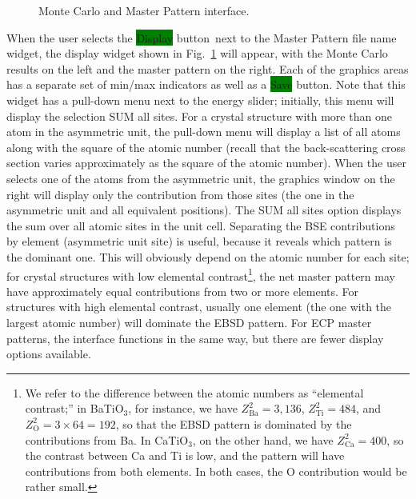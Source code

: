 \documentclass[DIV=calc, paper=letter, fontsize=11pt]{scrartcl}	 %
\newcommand{\button}[1]{\colorbox{green}{\textsf{#1}} button}
\begin{document}
\begin{figure}[t]
\leavevmode\centering
\epsfxsize=6in
\caption{\label{fig:MCMPdisplay}Monte Carlo and Master Pattern interface.}
\end{figure}


When the user selects the \button{Display}\ next to the Master Pattern file name widget, the display widget shown in 
Fig.~\ref{fig:MCMPdisplay} will appear, with the Monte Carlo results on the left and the master pattern on the right.  
Each of the graphics areas has a separate set of min/max indicators as well as a \button{Save}.
Note that this widget has a pull-down menu next to the energy slider; initially, this menu will display the selection
\textsf{SUM all sites}.  For a crystal structure with more than one atom in the asymmetric unit, the pull-down menu will
display a list of all atoms along with the square of the atomic number (recall that the back-scattering cross section varies
approximately as the square of the atomic number).  When the user selects one of the atoms from the asymmetric unit, 
the graphics window on the right will display only the contribution from those sites (the one in the asymmetric unit
and all equivalent positions).  The \textsf{SUM all sites} option displays the sum over all atomic sites in the unit cell.
Separating the BSE contributions by element (asymmetric unit site) is useful, because it reveals which pattern is the dominant one.  
This will obviously depend on the atomic number for each site; for crystal structures with low elemental contrast\footnote{We refer
to the difference between the atomic numbers as ``elemental contrast;''  in BaTiO$_3$, for instance, we have $Z^2_{\text{Ba}}=3,136$,
$Z^2_{\text{Ti}}=484$, and $Z^2_{\text{O}}=3\times 64=192$, so that the EBSD pattern is dominated by the contributions from Ba.  In CaTiO$_3$, on the
other hand, we have $Z^2_{\text{Ca}}=400$, so the contrast between Ca and Ti is low, and the pattern will have contributions from
both elements.  In both cases, the O contribution would be rather small.}, the net master pattern may have approximately equal contributions 
from two or more elements.  For structures with high elemental contrast, usually one element (the one with the largest atomic number) will
dominate the EBSD pattern.  For ECP master patterns, the interface functions in the same way, but there are fewer display options available.
\end{document}
